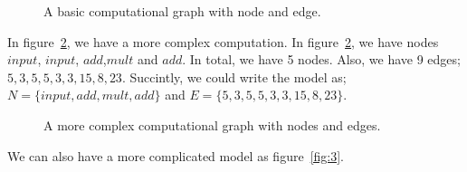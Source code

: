 \documentclass[vecarrow]{svproc}
\begin{document}
\begin{figure}
\caption{A basic computational graph with node and edge.}
\label{fig:1}
\end{figure}

In figure~\ref{fig:2}, we have a more complex computation. In figure~\ref{fig:2}, we have nodes $input$, $input$,
$add$,$mult$ and $add$. In total, we have 5 nodes. Also, we have 9 edges; $5,3,5,5,3,3,15,8,23$. Succintly, we could write the model as; $ N=\{input, add,mult, add\}$ and $E=\{5,3,5,5,3,3,15,8,23\}$.

\begin{figure}
\caption{A more complex computational graph with nodes and edges.}
\label{fig:2}
\end{figure}

We can also have a more complicated model as figure~\ref{fig:3}.
\end{document}
